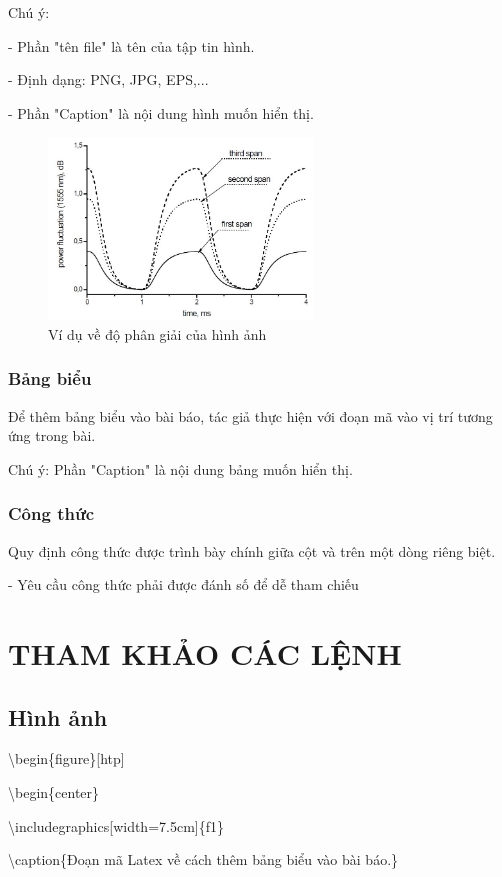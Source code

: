 \documentclass[a4paper,journal,11pt]{IEEEtran}
\begin{document}
Chú ý:

- Phần "tên file" là tên của tập tin hình.

- Định dạng: PNG, JPG, EPS,...

- Phần "Caption" là nội dung hình muốn hiển thị.
\begin{figure}[htp]
\begin{center}
\includegraphics[width=7cm]{f0}
\caption{Ví dụ về độ phân giải của hình ảnh}
\label{fig0}
\end{center}
\end{figure}
\subsubsection{Bảng biểu}Để thêm bảng biểu vào bài báo, tác giả thực hiện với đoạn mã vào vị trí tương ứng trong bài.

Chú ý: Phần "Caption" là nội dung bảng muốn hiển thị. \cite{cuong}

\subsubsection{Công thức} Quy định công thức được trình bày chính giữa cột và trên một dòng riêng biệt.

- Yêu cầu công thức phải được đánh số để dễ tham chiếu \cite{Alby}
\section{THAM KHẢO CÁC LỆNH}
\subsection{Hình ảnh}

\textbackslash begin\{figure\}[htp]

\textbackslash begin\{center\}

\textbackslash includegraphics[width=7.5cm]\{f1\}

\textbackslash caption\{Đoạn mã Latex về cách thêm bảng biểu vào bài báo.\}
\end{document}
